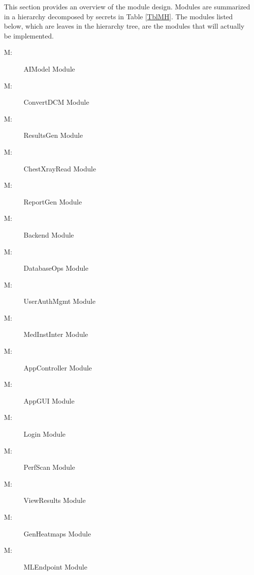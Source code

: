 \documentclass[12pt, titlepage]{article}
\newcounter{mnum}
\newcommand{\mthemnum}{M\themnum}
\begin{document}
This section provides an overview of the module design. Modules are summarized
in a hierarchy decomposed by secrets in Table \ref{TblMH}. The modules listed
below, which are leaves in the hierarchy tree, are the modules that will
actually be implemented.

\begin{multicols}{2}
\begin{description}
  \item [ \mthemnum \label{mAIModel}:] AIModel Module
  \item [ \mthemnum \label{mChXRR}:] ConvertDCM Module
  \item [ \mthemnum \label{mResGen}:] ResultsGen Module
  \item [ \mthemnum \label{mNLPModel}:] ChestXrayRead Module
  \item [ \mthemnum \label{mRepCompGen}:] ReportGen Module
  \item [ \mthemnum \label{mBackend}:] Backend Module
  \item [ \mthemnum \label{mDatabaseOps}:] DatabaseOps Module
  \item [ \mthemnum \label{mUserAuthMgmt}:] UserAuthMgmt Module
  \item [ \mthemnum \label{mMedInstInter}:] MedInstInter Module
  \item [ \mthemnum \label{mAppController}:] AppController Module
  \item [ \mthemnum \label{mAppGUI}:] AppGUI Module
  \item [ \mthemnum \label{mLogin}:] Login Module
  \item [ \mthemnum \label{mPerfScan}:] PerfScan Module
  \item [ \mthemnum \label{mViewResults}:] ViewResults Module
  \item [ \mthemnum \label{mHeatmaps}:] GenHeatmaps Module
  \item [ \mthemnum \label{mEndpoint}:] MLEndpoint Module
\end{description}
\end{multicols}
\end{document}
